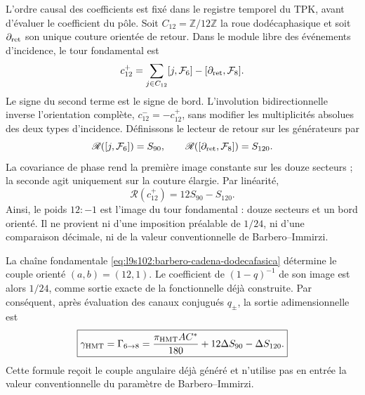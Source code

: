 L'ordre causal des coefficients est fixé dans le registre temporel du TPK,
avant d'évaluer le coefficient du pôle. Soit \(C_{12}=\mathbb Z/12\mathbb Z\) la roue
dodécaphasique et soit \(\partial_{\rm ret}\) son unique couture orientée de retour.
Dans le module libre des événements d'incidence, le tour fondamental est
\begin{equation}
 c_{12}^{+}
 =\sum_{j\in C_{12}}[j,\mathcal F_6]
  -[\partial_{\rm ret},\mathcal F_8].
 \label{eq:l9s102:barbero-cadena-dodecafasica}
\end{equation}
Le signe du second terme est le signe de bord. L'involution
bidirectionnelle inverse l'orientation complète,
\(c_{12}^{-}=-c_{12}^{+}\), sans modifier les multiplicités absolues des
deux types d'incidence. Définissons le lecteur de retour sur les
générateurs par
\begin{equation}
 \mathscr R([j,\mathcal F_6])=S_{90},
 \qquad
 \mathscr R([\partial_{\rm ret},\mathcal F_8])=S_{120}.
 \label{eq:l9s102:barbero-lector-retorno}
\end{equation}
La covariance de phase rend la première image constante sur les douze
secteurs ; la seconde agit uniquement sur la couture élargie. Par linéarité,
\begin{equation}
 \boxed{\mathscr R(c_{12}^{+})=12S_{90}-S_{120}.}
 \label{eq:l9s102:barbero-peso-generado}
\end{equation}
Ainsi, le poids \(12:-1\) est l'image du tour fondamental : douze secteurs et
un bord orienté. Il ne provient ni d'une imposition préalable de \(1/24\), ni d'une
comparaison décimale, ni de la valeur conventionnelle de Barbero--Immirzi.

\begin{theorem}
\label{thm:l9s102:barbero-funcional}
La chaîne fondamentale \eqref{eq:l9s102:barbero-cadena-dodecafasica} détermine
le couple orienté \((a,b)=(12,1)\). Le coefficient de \((1-q)^{-1}\) de son image est
alors \(1/24\), comme sortie exacte de la fonctionnelle déjà construite. Par conséquent,
après évaluation des canaux conjugués \(q_\pm\), la sortie adimensionnelle est
\begin{equation}
 \boxed{
 \gamma_{\rm HMT}=\Gamma_{6\to8}
 =\frac{\pi_{\rm HMT}AC^*}{180}
   +12\Delta S_{90}-\Delta S_{120}.}
 \label{eq:l9s102:barbero-gamma}
\end{equation}
Cette formule reçoit le couple angulaire déjà généré et n'utilise pas en entrée
la valeur conventionnelle du paramètre de Barbero--Immirzi.
\end{theorem}


